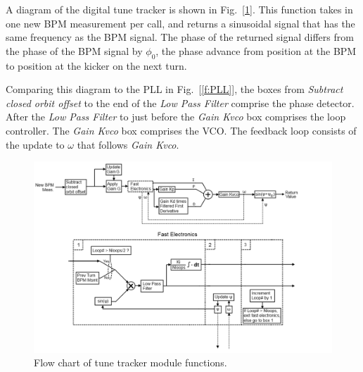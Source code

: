 A diagram of the digital tune tracker is shown in
Fig.~[\ref{f:CdTT}].  This function takes in one new BPM measurement
per call, and returns a sinusoidal signal that has the same frequency
as the BPM signal.  The phase of the returned signal differs from the
phase of the BPM signal by $\phi_0$, the phase advance from position
at the BPM to position at the kicker on the next turn.

Comparing this diagram to the PLL in Fig.~[\ref{f:PLL}], the boxes
from {\it Subtract closed orbit offset} to the end of the {\it Low
Pass Filter} comprise the phase detector.  After the {\it Low Pass
Filter} to just before the {\it Gain Kvco} box comprises the loop
controller.  The {\it Gain Kvco} box comprises the VCO.  The feedback
loop consists of the update to $\omega$ that follows {\it Gain Kvco}.

\begin{figure}
\includegraphics[width=\columnwidth]{TT-Flow.png}
\caption{
Flow chart of tune tracker module functions.}
\label{f:CdTT}
\end{figure}

\clearpage

